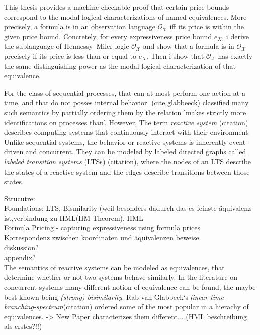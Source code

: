 \begin{isabellebody}
\begin{isamarkuptext}
This thesis provides a machine-checkable proof that certain price bounds correspond to the modal-logical characterizations of named equivalences. 
More precisely, a formula \isa{{\isasymphi}} is in an observation language $\mathcal{O_X}$ iff its price is within the given price bound.
Concretely, for every expressiveness price bound $e_X$, i derive the sublanguage of Hennessy--Miler logic $\mathcal{O_X}$ and show that a formula \isa{{\isasymphi}} is in $\mathcal{O_X}$ precisely if its price  is less than or equal to $e_X$.
Then i show that $\mathcal{O_X}$ has exactly the same distinguishing power as the modal-logical characterization of that equivalence.

For the class of sequential processes, that can at most perform one action at a time, and that do not posses internal behavior.
(cite glabbeeck) classified many such semantics by partially ordering them by the relation 'makes strictly more identifications on processes than'. However,
The term \emph{reactive system} (citation) describes computing systems that continuously interact with their environment. Unlike sequential systems, 
the behavior or reactive systems is inherently event-driven and concurrent. They can be modeled by labeled directed graphs called \emph{labeled transition systems} (LTSs) (citation),
where the nodes of an LTS describe the states of a reactive system and the edges describe transitions between those states.


Strucutre:\\
Foundations: LTS, Bismilarity (weil besonders dadurch das es feinste äquivalenz ist,verbindung zu HML(HM Theorem), HML \\
Formula Pricing - capturing expressiveness using formula prices \\
Korrespondenz zwischen koordinaten und äquivalenzen beweise\\
diskussion?\\
appendix?\\

The semantics of reactive systems can be modeled as equivalences, that determine whether or not two systems behave similarly.
In the literature on concurrent systems many different notion of equivalence can be found, the maybe best known being \emph{(strong) bisimilarity}.
Rab van Glabbeek`s \emph{linear-time--branching-spectrum}(citation) ordered some of the most popular in a hierachy of equivalences.
-> New Paper characterizes them different... (HML beschreibung als erstes?!!)



\end{isamarkuptext}
\end{isabellebody}
